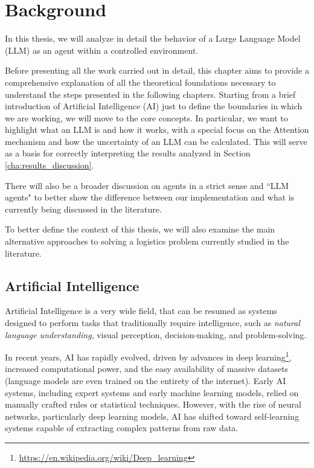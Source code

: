 \chapter{Background}
\label{cha:background}

In this thesis, we will analyze in detail the behavior of a Large Language Model
(LLM) as an agent within a controlled environment.

Before presenting all the work carried out in detail, this chapter aims to
provide a comprehensive explanation of all the theoretical foundations necessary
to understand the steps presented in the following chapters. Starting from a brief
introduction of Artificial Intelligence (AI) just to define the boundaries in which
we are working, we will move to the core concepts. In particular, we want to
highlight what an LLM is and how it works, with a special focus on the Attention
mechanism and how the uncertainty of an LLM can be calculated. This will serve
as a basis for correctly interpreting the results analyzed in Section
\ref{cha:results_discussion}.

There will also be a broader discussion on agents in a strict sense and ``LLM
agents" to better show the difference between our implementation and what is currently
being discussed in the literature.

To better define the context of this thesis, we will also examine the main
alternative approaches to solving a logistics problem currently studied in the
literature.

\section{Artificial Intelligence}
\label{sec:artificial_intelligence}

Artificial Intelligence is a very wide field, that can be resumed as systems
designed to perform tasks that traditionally require intelligence, such as \emph{natural
language understanding}, visual perception, decision-making, and problem-solving.

In recent years, AI has rapidly evolved, driven by advances in deep learning\footnote{\url{https://en.wikipedia.org/wiki/Deep_learning}},
increased computational power, and the easy availability of massive datasets (language
models are even trained on the entirety of the internet). Early AI systems,
including expert systems and early machine learning models, relied on manually crafted
rules or statistical techniques. However, with the rise of neural networks,
particularly deep learning models, AI has shifted toward self-learning systems capable
of extracting complex patterns from raw data.

